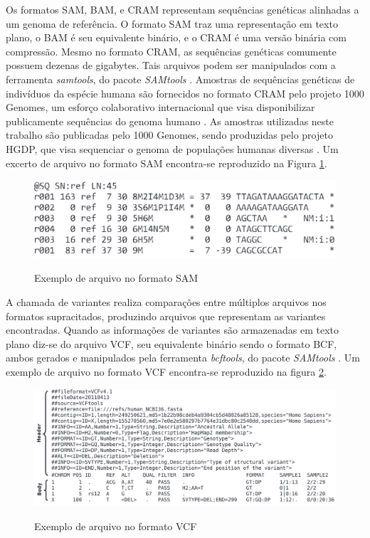 \documentclass[cic,tc]{iiufrgs}
\begin{document}
Os formatos SAM, BAM, e CRAM representam sequências genéticas alinhadas a um
genoma de referência. O formato SAM traz uma representação em texto plano, o
BAM é seu equivalente binário, e o CRAM é uma versão binária com compressão.
Mesmo no formato CRAM, as sequências genéticas comumente possuem dezenas de
gigabytes. Tais arquivos podem ser manipulados com a ferramenta
\textit{samtools}, do pacote \textit{SAMtools} \cite{danecek2021twelve}.
Amostras de sequências genéticas de indivíduos da espécie humana são fornecidos
no formato CRAM pelo projeto 1000 Genomes, um esforço colaborativo
internacional que visa disponibilizar publicamente sequências do genoma humano
\cite{via20101000}. As amostras utilizadas neste trabalho são publicadas pelo
1000 Genomes, sendo produzidas pelo projeto HGDP, que visa sequenciar o genoma
de populações humanas diversas \cite{cavalli2005human}. Um excerto de arquivo
no formato SAM encontra-se reproduzido na Figura \ref{fig:sam}.

\begin{figure}[h] \caption{Exemplo de arquivo no formato SAM} \begin{center}
\includegraphics[width=0.8\linewidth]{img/sam.png} \end{center}
 \label{fig:sam} \end{figure}

A chamada de variantes realiza comparações entre múltiplos arquivos nos
formatos supracitados, produzindo arquivos que representam as variantes
encontradas. Quando as informações de variantes são armazenadas em texto plano
diz-se do arquivo VCF, seu equivalente binário sendo o formato BCF, ambos
gerados e manipulados pela ferramenta \textit{bcftools}, do pacote
\textit{SAMtools} \cite{danecek2021twelve}. Um exemplo de arquivo no formato
VCF encontra-se reproduzido na figura \ref{fig:vcf}.

\begin{figure} \caption{Exemplo de arquivo no formato VCF} \begin{center}
\includegraphics[width=0.8\linewidth]{img/vcf.png} \end{center}
 \label{fig:vcf} \end{figure}
\end{document}
